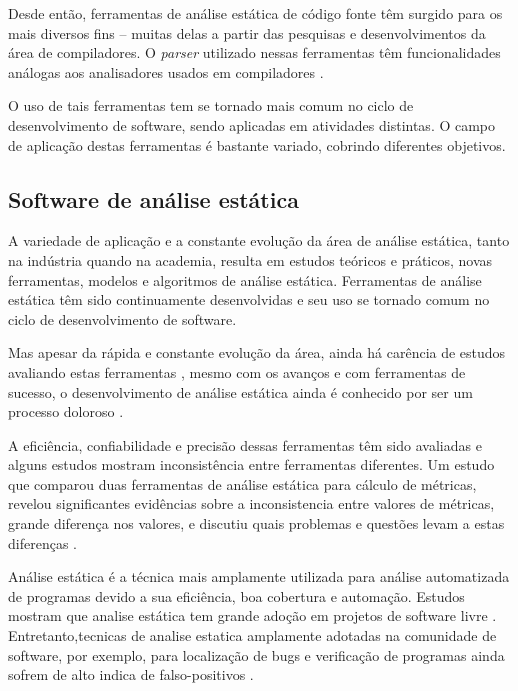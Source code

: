 Desde então, ferramentas de análise estática de código fonte têm surgido para
os mais diversos fins -- muitas delas a partir das pesquisas e
desenvolvimentos da área de compiladores.  O {\it parser} utilizado nessas
ferramentas têm funcionalidades análogas aos analisadores usados em
compiladores \cite{Anderson2008}.

O uso de tais ferramentas tem se tornado mais comum no ciclo de desenvolvimento de
software, sendo aplicadas em atividades distintas.
O campo de aplicação destas ferramentas é bastante variado, cobrindo diferentes
objetivos.

\subsection{Software de análise estática}

A variedade de aplicação e a constante evolução da área de análise estática, 
tanto na indústria quando na academia, resulta em  estudos teóricos e práticos, novas ferramentas, modelos e
algoritmos de análise estática. Ferramentas de análise estática têm sido
continuamente desenvolvidas e seu uso se tornado comum no ciclo de desenvolvimento de
software.


Mas apesar da rápida e constante evolução da área, ainda há carência de estudos
avaliando estas ferramentas \cite{Li2010}, mesmo com os avanços e com
ferramentas de sucesso, o desenvolvimento de análise estática ainda é conhecido
por ser um processo doloroso \cite{toman2017taming}.

A eficiência, confiabilidade e precisão dessas ferramentas têm sido avaliadas e
alguns estudos mostram inconsistência entre ferramentas diferentes.
Um estudo que comparou duas ferramentas de análise estática para cálculo de métricas,
revelou significantes evidências sobre a inconsistencia entre valores de métricas,
grande diferença nos valores, e discutiu quais problemas e questões levam a estas
diferenças \cite{Alemerien2013}.

Análise estática é a técnica mais amplamente utilizada para análise
automatizada de programas devido a sua eficiência, boa cobertura e automação.
Estudos mostram que analise estática tem grande adoção em projetos de software
livre \cite{beller2016analyzing}.
Entretanto,tecnicas de analise estatica amplamente adotadas na comunidade de software,
por exemplo, para localização de bugs e verificação de programas 
ainda sofrem de alto indica de falso-positivos \cite{Gosain2015}.

